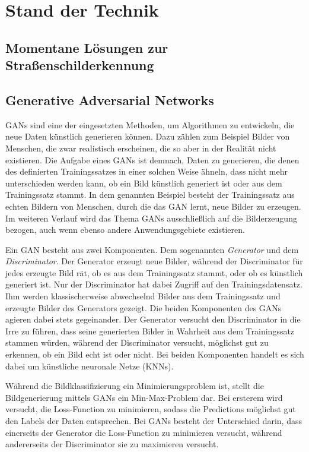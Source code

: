 \chapter{Stand der Technik}
\section{Momentane Lösungen zur Straßenschilderkennung}
\section{Generative Adversarial Networks}
\acp{GAN} sind eine der eingesetzten Methoden, um Algorithmen zu entwickeln, die neue Daten künstlich generieren können. Dazu zählen zum Beispiel Bilder von Menschen, die zwar realistisch erscheinen, die so aber in der Realität nicht existieren. Die Aufgabe eines \acp{GAN} ist demnach, Daten zu generieren, die denen des definierten Trainingssatzes in einer solchen Weise ähneln, dass nicht mehr unterschieden werden kann, ob ein Bild künstlich generiert ist oder aus dem Trainingssatz stammt. In dem genannten Beispiel besteht der Trainingssatz aus echten Bildern von Menschen, durch die das \ac{GAN} lernt, neue Bilder zu erzeugen. Im weiteren Verlauf wird das Thema \acp{GAN} ausschließlich auf die Bilderzeugung bezogen, auch wenn ebenso andere Anwendungsgebiete existieren. \cite{visualApproach}

Ein \ac{GAN} besteht aus zwei Komponenten. Dem sogenannten \emph{Generator} und dem \emph{Discriminator}. Der Generator erzeugt neue Bilder, während der Discriminator für jedes erzeugte Bild rät, ob es aus dem Trainingssatz stammt, oder ob es künstlich generiert ist. Nur der Discriminator hat dabei Zugriff auf den Trainingsdatensatz. Ihm werden klassischerweise abwechselnd Bilder aus dem Trainingssatz und erzeugte Bilder des Generators gezeigt. Die beiden Komponenten des \acp{GAN} agieren dabei stets gegeinander. Der Generator versucht den Discriminator in die Irre zu führen, dass seine generierten Bilder in Wahrheit aus dem Trainingssatz stammen würden, während der Discriminator versucht, möglichst gut zu erkennen, ob ein Bild echt ist oder nicht. Bei beiden Komponenten handelt es sich dabei um künstliche neuronale Netze (\acp{KNN}). \cite{visualApproach}

Während die Bildklassifizierung ein Minimierungsproblem ist, stellt die Bildgenerierung mittels \acp{GAN} ein Min-Max-Problem dar. Bei ersterem wird versucht, die Loss-Function zu minimieren, sodass die Predictions möglichst gut den Labels der Daten entsprechen. Bei \acp{GAN} besteht der Unterschied darin, dass einerseits der Generator die Loss-Function zu minimieren versucht, während andererseits der Discriminator sie zu maximieren versucht.

